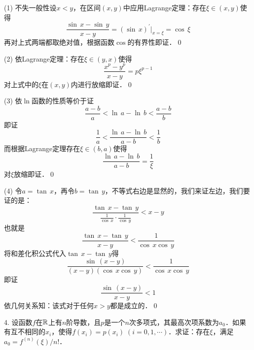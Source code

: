 (1) \prove 不失一般性设$x<y$，在区间$(x,y)$中应用Lagrange定理：存在$\xi \in (x,y)$使得
\begin{equation}
    \frac{\sin \, x - \sin \, y}{x-y} = \left(\sin \, x\right)^\prime \bigg\vert_{x = \xi} = \cos \, \xi
\end{equation}
再对上式两端都取绝对值，根据函数$\cos $的有界性即证．\qed\bigskip

(2) \prove 依Lagrange定理：存在$\xi \in (y, x)$使得
\begin{equation}
    \frac{x^p-y^p}{x-y} = p \xi^{p-1}
\end{equation}
对上式中的$\xi$在$(x,y)$内进行放缩即证．\qed\bigskip

(3) \prove 依$\ln$函数的性质等价于证
\begin{equation}
    \frac{a-b}{a} < \ln \, a - \ln \, b < \frac{a-b}{b}
\end{equation}
即证
\begin{equation}
    \frac{1}{a} < \frac{\ln \, a - \ln \, b}{a-b} < \frac{1}{b}
\end{equation}
而根据Lagrange定理存在$\xi \in (b,a)$使得
\begin{equation}
    \frac{\ln \, a - \ln \, b}{a-b} = \frac{1}{\xi}
\end{equation}
对$\xi$放缩即证．\qed\bigskip

(4) \prove 令$a = \tan \, x$，再令$b = \tan \, y$，不等式右边是显然的，我们来证左边，我们要证的是：
\begin{equation}
    \frac{\tan \, x - \tan \, y}{\displaystyle\frac{1}{\cos \, x}\cdot \displaystyle\frac{1}{\cos \, y}} < x - y
\end{equation}
也就是
\begin{equation}
    \frac{\tan \, x - \tan \, y}{x-y} < \frac{1}{\cos \, x \cos \, y}
\end{equation}
将和差化积公式代入$\tan \, x - \tan \, y$得
\begin{equation}
    \frac{\sin \, \left(x-y\right)}{\left(x-y\right)(\cos \, x \cos \, y)} < \frac{1}{\cos \, x \cos \, y}
\end{equation}
即证
\begin{equation}
    \frac{\sin \, \left(x-y\right)}{x-y} < 1
\end{equation}
依几何关系知：该式对于任何$x>y$都是成立的．\qed\bigskip

4. 设函数$f$在$\mathbb{R}$上有$n$阶导数，且$p$是一个$n$次多项式，其最高次项系数为$a_0$．如果有互不相同的$x_i$，使得$f(x_i)=p(x_i) \; (i=0,1,\cdots)$．求证：存在$\xi$，满足$a_0 = f^{(n)}(\xi)/n!$．

